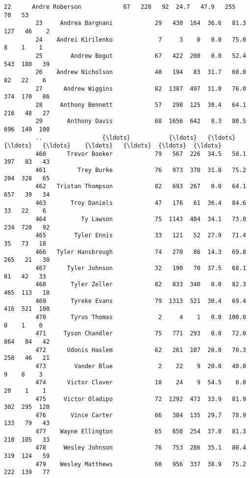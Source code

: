 \documentclass[11pt]{article}
\begin{document}
\begin{Verbatim}[commandchars=\\\{\}]
         22      Andre Roberson            67   228   92  24.7   47.9   255   70   53   
         23     Andrea Bargnani            29   430  164  36.6   81.3   127   46    2   
         24    Andrei Kirilenko             7     3    0   0.0   75.0     8    1    1   
         25        Andrew Bogut            67   422  200   0.0   52.4   543  180   39   
         26    Andrew Nicholson            40   194   83  31.7   60.0    82   22    6   
         27      Andrew Wiggins            82  1387  497  31.0   76.0   374  170   86   
         28     Anthony Bennett            57   298  125  30.4   64.1   216   48   27   
         29       Anthony Davis            68  1656  642   8.3   80.5   696  149  100   
         ..                 {\ldots}           {\ldots}   {\ldots}  {\ldots}   {\ldots}    {\ldots}   {\ldots}  {\ldots}  {\ldots}   
         460      Trevor Booker            79   567  226  34.5   58.1   397   83   43   
         461         Trey Burke            76   973  370  31.8   75.2   204  328   65   
         462   Tristan Thompson            82   693  267   0.0   64.1   657   39   34   
         463       Troy Daniels            47   176   61  36.4   84.6    33   22    6   
         464          Ty Lawson            75  1143  404  34.1   73.0   234  720   92   
         465        Tyler Ennis            33   121   52  27.9   71.4    35   73   18   
         466   Tyler Hansbrough            74   270   86  14.3   69.8   265   21   30   
         467      Tyler Johnson            32   190   70  37.5   68.1    81   42   33   
         468       Tyler Zeller            82   833  340   0.0   82.3   465  113   18   
         469       Tyreke Evans            79  1313  521  30.4   69.4   416  521  100   
         470       Tyrus Thomas             2     4    1   0.0  100.0     0    1    0   
         471     Tyson Chandler            75   771  293   0.0   72.0   864   84   42   
         472      Udonis Haslem            62   261  107  20.0   70.3   258   46   21   
         473        Vander Blue             2    22    9  20.0   40.0     9    8    3   
         474      Victor Claver            10    24    9  54.5    0.0    20    1    1   
         475     Victor Oladipo            72  1292  473  33.9   81.9   302  295  120   
         476       Vince Carter            66   384  135  29.7   78.9   133   79   43   
         477    Wayne Ellington            65   650  254  37.0   81.3   210  105   33   
         478     Wesley Johnson            76   753  286  35.1   80.4   319  124   59   
         479    Wesley Matthews            60   956  337  38.9   75.2   222  139   77   

\end{Verbatim}
\end{document}
